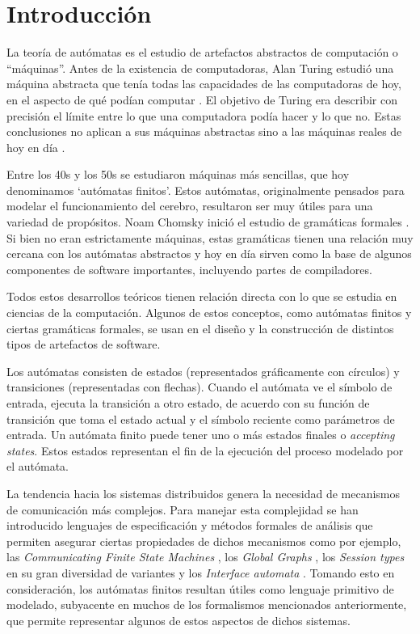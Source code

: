 \chapter{Introducción}
La teoría de autómatas es el estudio de artefactos abstractos de computación o ``máquinas''. Antes de la existencia de computadoras, Alan Turing estudió una máquina abstracta que tenía todas las capacidades de las computadoras de hoy, en el aspecto de qué podían computar \cite{turing:plms-s2-42_1,turing:plms-s2-43_1}. El objetivo de Turing era describir con precisión el límite entre lo que una computadora podía hacer y lo que no. Estas conclusiones no aplican a sus máquinas abstractas sino a las máquinas reales de hoy en día \cite{ullman}.

Entre los 40s y los 50s se estudiaron máquinas más sencillas, que hoy denominamos `autómatas finitos'. Estos autómatas, originalmente pensados para modelar el funcionamiento del cerebro, resultaron ser muy útiles para una variedad de propósitos. Noam Chomsky inició el estudio de gramáticas formales \cite{chomsky:iretit-2_3}. Si bien no eran estrictamente máquinas, estas gramáticas tienen una relación muy cercana con los autómatas abstractos y hoy en día sirven como la base de algunos componentes de software importantes, incluyendo partes de compiladores.

Todos estos desarrollos teóricos tienen relación directa con lo que se estudia en ciencias de la computación. Algunos de estos conceptos, como autómatas finitos y ciertas gramáticas formales, se usan en el diseño y la construcción de distintos tipos de artefactos de software.

Los autómatas consisten de estados (representados gráficamente con círculos) y transiciones (representadas con flechas). Cuando el autómata ve el símbolo de entrada, ejecuta la transición a otro estado, de acuerdo con su función de transición que toma el estado actual y el símbolo reciente como parámetros de entrada. Un autómata finito puede tener uno o más estados finales o \emph{accepting states}. Estos estados representan el fin de la ejecución del proceso modelado por el autómata.

La tendencia hacia los sistemas distribuidos genera la necesidad de mecanismos de comunicación más complejos. Para manejar esta complejidad se han introducido lenguajes de especificación y métodos formales de análisis que permiten asegurar ciertas propiedades de dichos mecanismos como por ejemplo, las \emph{Communicating Finite State Machines} \cite{brand:jacm-30_2}, los \emph{Global Graphs} \cite{castagna:lmcs-8_1}, los \emph{Session types} en su gran diversidad de variantes \cite{honda:esop98,honda:popl08} y los \emph{Interface automata} \cite{dealfaro:esec-fse-01}. Tomando esto en consideración, los autómatas finitos resultan útiles como lenguaje primitivo de modelado, subyacente en muchos de los formalismos mencionados anteriormente, que permite representar algunos de estos aspectos de dichos sistemas.

